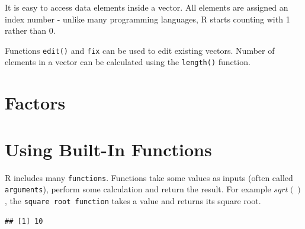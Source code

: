 \documentclass[10pt, letterpaper, twoside]{memoir}\usepackage{knitr}
\begin{document}
It is easy to access data elements inside a vector. All elements are assigned an index number - unlike many programming languages, R starts counting with 1 rather than 0. 

\begin{knitrout}
\color{fgcolor}\begin{kframe}
\begin{alltt}
\end{alltt}
\end{kframe}
\end{knitrout}

Functions \texttt{edit()} and \texttt{fix} can be used to edit existing vectors. Number of elements in a vector can be calculated using the \texttt{length()} function.
\begin{knitrout}
\color{fgcolor}\begin{kframe}
\begin{alltt}
\end{alltt}
\end{kframe}
\end{knitrout}

\section{Factors}

\section{Using Built-In Functions}

R includes many \texttt{functions}.  Functions take some values as inputs (often called \texttt{arguments}), perform some calculation and return the result. For example $sqrt()$, the \texttt{square root function} takes a value and returns its square root.

\begin{knitrout}
\color{fgcolor}\begin{kframe}
\begin{alltt}
\hlstd{(}\hlstd{)}  
\end{alltt}
\begin{verbatim}
## [1] 10
\end{verbatim}
\end{kframe}
\end{knitrout}
\end{document}
